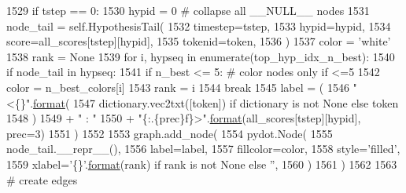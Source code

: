 \begin{DoxyCode}
1529                 \textcolor{keywordflow}{if} tstep == 0:
1530                     hypid = 0  \textcolor{comment}{# collapse all \_\_NULL\_\_ nodes}
1531                 node\_tail = self.HypothesisTail(
1532                     timestep=tstep,
1533                     hypid=hypid,
1534                     score=all\_scores[tstep][hypid],
1535                     tokenid=token,
1536                 )
1537                 color = \textcolor{stringliteral}{'white'}
1538                 rank = \textcolor{keywordtype}{None}
1539                 \textcolor{keywordflow}{for} i, hypseq \textcolor{keywordflow}{in} enumerate(top\_hyp\_idx\_n\_best):
1540                     \textcolor{keywordflow}{if} node\_tail \textcolor{keywordflow}{in} hypseq:
1541                         \textcolor{keywordflow}{if} n\_best <= 5:  \textcolor{comment}{# color nodes only if <=5}
1542                             color = n\_best\_colors[i]
1543                         rank = i
1544                         \textcolor{keywordflow}{break}
1545                 label = (
1546                     \textcolor{stringliteral}{"<\{\}"}.\hyperlink{namespaceparlai_1_1chat__service_1_1services_1_1messenger_1_1shared__utils_a32e2e2022b824fbaf80c747160b52a76}{format}(
1547                         dictionary.vec2txt([token]) \textcolor{keywordflow}{if} dictionary \textcolor{keywordflow}{is} \textcolor{keywordflow}{not} \textcolor{keywordtype}{None} \textcolor{keywordflow}{else} token
1548                     )
1549                     + \textcolor{stringliteral}{" : "}
1550                     + \textcolor{stringliteral}{"\{:.\{prec\}f\}>"}.\hyperlink{namespaceparlai_1_1chat__service_1_1services_1_1messenger_1_1shared__utils_a32e2e2022b824fbaf80c747160b52a76}{format}(all\_scores[tstep][hypid], prec=3)
1551                 )
1552 
1553                 graph.add\_node(
1554                     pydot.Node(
1555                         node\_tail.\_\_repr\_\_(),
1556                         label=label,
1557                         fillcolor=color,
1558                         style=\textcolor{stringliteral}{'filled'},
1559                         xlabel=\textcolor{stringliteral}{'\{\}'}.\hyperlink{namespaceparlai_1_1chat__service_1_1services_1_1messenger_1_1shared__utils_a32e2e2022b824fbaf80c747160b52a76}{format}(rank) \textcolor{keywordflow}{if} rank \textcolor{keywordflow}{is} \textcolor{keywordflow}{not} \textcolor{keywordtype}{None} \textcolor{keywordflow}{else} \textcolor{stringliteral}{''},
1560                     )
1561                 )
1562 
1563         \textcolor{comment}{# create edges}

\end{DoxyCode}
